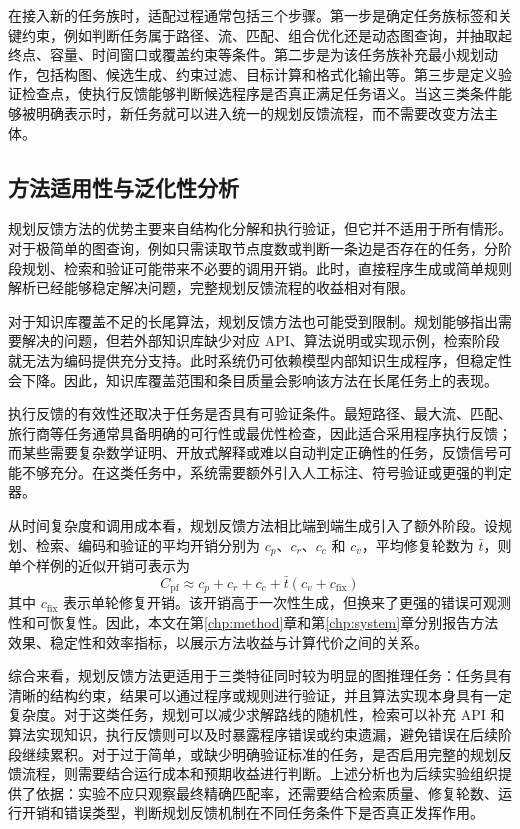 在接入新的任务族时，适配过程通常包括三个步骤。第一步是确定任务族标签和关键约束，例如判断任务属于路径、流、匹配、组合优化还是动态图查询，并抽取起终点、容量、时间窗口或覆盖约束等条件。第二步是为该任务族补充最小规划动作，包括构图、候选生成、约束过滤、目标计算和格式化输出等。第三步是定义验证检查点，使执行反馈能够判断候选程序是否真正满足任务语义。当这三类条件能够被明确表示时，新任务就可以进入统一的规划反馈流程，而不需要改变方法主体。

\subsection{方法适用性与泛化性分析}

规划反馈方法的优势主要来自结构化分解和执行验证，但它并不适用于所有情形。对于极简单的图查询，例如只需读取节点度数或判断一条边是否存在的任务，分阶段规划、检索和验证可能带来不必要的调用开销。此时，直接程序生成或简单规则解析已经能够稳定解决问题，完整规划反馈流程的收益相对有限。

对于知识库覆盖不足的长尾算法，规划反馈方法也可能受到限制。规划能够指出需要解决的问题，但若外部知识库缺少对应 API、算法说明或实现示例，检索阶段就无法为编码提供充分支持。此时系统仍可依赖模型内部知识生成程序，但稳定性会下降。因此，知识库覆盖范围和条目质量会影响该方法在长尾任务上的表现。

执行反馈的有效性还取决于任务是否具有可验证条件。最短路径、最大流、匹配、旅行商等任务通常具备明确的可行性或最优性检查，因此适合采用程序执行反馈；而某些需要复杂数学证明、开放式解释或难以自动判定正确性的任务，反馈信号可能不够充分。在这类任务中，系统需要额外引入人工标注、符号验证或更强的判定器。

从时间复杂度和调用成本看，规划反馈方法相比端到端生成引入了额外阶段。设规划、检索、编码和验证的平均开销分别为 $c_p$、$c_r$、$c_c$ 和 $c_v$，平均修复轮数为 $\bar{t}$，则单个样例的近似开销可表示为
\begin{equation}
C_{\mathrm{pf}}\approx c_p+c_r+c_c+\bar{t}(c_v+c_{\mathrm{fix}})
\end{equation}
其中 $c_{\mathrm{fix}}$ 表示单轮修复开销。该开销高于一次性生成，但换来了更强的错误可观测性和可恢复性。因此，本文在第\ref{chp:method}章和第\ref{chp:system}章分别报告方法效果、稳定性和效率指标，以展示方法收益与计算代价之间的关系。

综合来看，规划反馈方法更适用于三类特征同时较为明显的图推理任务：任务具有清晰的结构约束，结果可以通过程序或规则进行验证，并且算法实现本身具有一定复杂度。对于这类任务，规划可以减少求解路线的随机性，检索可以补充 API 和算法实现知识，执行反馈则可以及时暴露程序错误或约束遗漏，避免错误在后续阶段继续累积。对于过于简单，或缺少明确验证标准的任务，是否启用完整的规划反馈流程，则需要结合运行成本和预期收益进行判断。上述分析也为后续实验组织提供了依据：实验不应只观察最终精确匹配率，还需要结合检索质量、修复轮数、运行开销和错误类型，判断规划反馈机制在不同任务条件下是否真正发挥作用。


